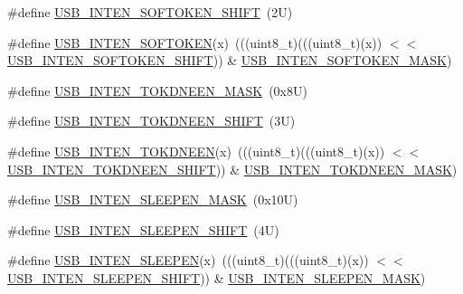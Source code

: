 \begin{DoxyCompactItemize}
\#define \mbox{\hyperlink{group___u_s_b___register___masks_ga8d9738dcc6d852ffd09dbac5e8058431}{U\+S\+B\+\_\+\+I\+N\+T\+E\+N\+\_\+\+S\+O\+F\+T\+O\+K\+E\+N\+\_\+\+S\+H\+I\+FT}}~(2\+U)
\item 
\#define \mbox{\hyperlink{group___u_s_b___register___masks_ga18c02f9334adbb0d5221e89b7a38279d}{U\+S\+B\+\_\+\+I\+N\+T\+E\+N\+\_\+\+S\+O\+F\+T\+O\+K\+EN}}(x)~(((uint8\+\_\+t)(((uint8\+\_\+t)(x)) $<$$<$ \mbox{\hyperlink{group___u_s_b___register___masks_ga8d9738dcc6d852ffd09dbac5e8058431}{U\+S\+B\+\_\+\+I\+N\+T\+E\+N\+\_\+\+S\+O\+F\+T\+O\+K\+E\+N\+\_\+\+S\+H\+I\+FT}})) \& \mbox{\hyperlink{group___u_s_b___register___masks_ga6398aff7e3278bea66900a35b616563f}{U\+S\+B\+\_\+\+I\+N\+T\+E\+N\+\_\+\+S\+O\+F\+T\+O\+K\+E\+N\+\_\+\+M\+A\+SK}})
\item 
\#define \mbox{\hyperlink{group___u_s_b___register___masks_ga59b367a1e2496ad06deee9d86001aa7d}{U\+S\+B\+\_\+\+I\+N\+T\+E\+N\+\_\+\+T\+O\+K\+D\+N\+E\+E\+N\+\_\+\+M\+A\+SK}}~(0x8\+U)
\item 
\#define \mbox{\hyperlink{group___u_s_b___register___masks_ga2e0c8229886bcca7e35bee00cd90d236}{U\+S\+B\+\_\+\+I\+N\+T\+E\+N\+\_\+\+T\+O\+K\+D\+N\+E\+E\+N\+\_\+\+S\+H\+I\+FT}}~(3\+U)
\item 
\#define \mbox{\hyperlink{group___u_s_b___register___masks_ga44ac403f2bcc92e328bbd667ecbc3cda}{U\+S\+B\+\_\+\+I\+N\+T\+E\+N\+\_\+\+T\+O\+K\+D\+N\+E\+EN}}(x)~(((uint8\+\_\+t)(((uint8\+\_\+t)(x)) $<$$<$ \mbox{\hyperlink{group___u_s_b___register___masks_ga2e0c8229886bcca7e35bee00cd90d236}{U\+S\+B\+\_\+\+I\+N\+T\+E\+N\+\_\+\+T\+O\+K\+D\+N\+E\+E\+N\+\_\+\+S\+H\+I\+FT}})) \& \mbox{\hyperlink{group___u_s_b___register___masks_ga59b367a1e2496ad06deee9d86001aa7d}{U\+S\+B\+\_\+\+I\+N\+T\+E\+N\+\_\+\+T\+O\+K\+D\+N\+E\+E\+N\+\_\+\+M\+A\+SK}})
\item 
\#define \mbox{\hyperlink{group___u_s_b___register___masks_gac2cf7613141a7333e152b43e42e6ee53}{U\+S\+B\+\_\+\+I\+N\+T\+E\+N\+\_\+\+S\+L\+E\+E\+P\+E\+N\+\_\+\+M\+A\+SK}}~(0x10\+U)
\item 
\#define \mbox{\hyperlink{group___u_s_b___register___masks_ga8e3c25dd5e743c21fc277d45640d5a5e}{U\+S\+B\+\_\+\+I\+N\+T\+E\+N\+\_\+\+S\+L\+E\+E\+P\+E\+N\+\_\+\+S\+H\+I\+FT}}~(4\+U)
\item 
\#define \mbox{\hyperlink{group___u_s_b___register___masks_ga11c1e1ba0d238744202095c978088a8a}{U\+S\+B\+\_\+\+I\+N\+T\+E\+N\+\_\+\+S\+L\+E\+E\+P\+EN}}(x)~(((uint8\+\_\+t)(((uint8\+\_\+t)(x)) $<$$<$ \mbox{\hyperlink{group___u_s_b___register___masks_ga8e3c25dd5e743c21fc277d45640d5a5e}{U\+S\+B\+\_\+\+I\+N\+T\+E\+N\+\_\+\+S\+L\+E\+E\+P\+E\+N\+\_\+\+S\+H\+I\+FT}})) \& \mbox{\hyperlink{group___u_s_b___register___masks_gac2cf7613141a7333e152b43e42e6ee53}{U\+S\+B\+\_\+\+I\+N\+T\+E\+N\+\_\+\+S\+L\+E\+E\+P\+E\+N\+\_\+\+M\+A\+SK}})
$$
\end{DoxyCompactItemize}
